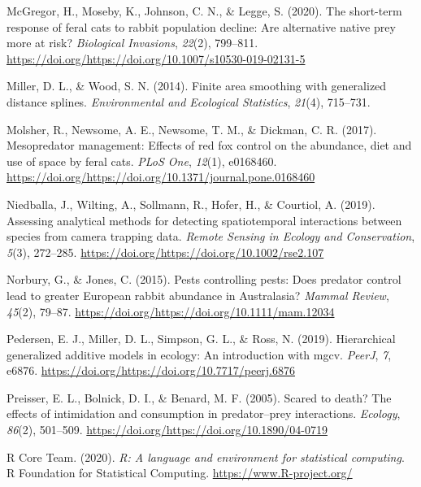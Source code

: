 \documentclass[]{elsarticle} %
\begin{document}
\leavevmode\hypertarget{ref-mcgregor2020short}{}%
McGregor, H., Moseby, K., Johnson, C. N., \& Legge, S. (2020). The short-term response of feral cats to rabbit population decline: Are alternative native prey more at risk? \emph{Biological Invasions}, \emph{22}(2), 799--811. \url{https://doi.org/https://doi.org/10.1007/s10530-019-02131-5}

\leavevmode\hypertarget{ref-miller2014finite}{}%
Miller, D. L., \& Wood, S. N. (2014). Finite area smoothing with generalized distance splines. \emph{Environmental and Ecological Statistics}, \emph{21}(4), 715--731.

\leavevmode\hypertarget{ref-molsher2017mesopredator}{}%
Molsher, R., Newsome, A. E., Newsome, T. M., \& Dickman, C. R. (2017). Mesopredator management: Effects of red fox control on the abundance, diet and use of space by feral cats. \emph{PLoS One}, \emph{12}(1), e0168460. \url{https://doi.org/https://doi.org/10.1371/journal.pone.0168460}

\leavevmode\hypertarget{ref-niedballa2019assessing}{}%
Niedballa, J., Wilting, A., Sollmann, R., Hofer, H., \& Courtiol, A. (2019). Assessing analytical methods for detecting spatiotemporal interactions between species from camera trapping data. \emph{Remote Sensing in Ecology and Conservation}, \emph{5}(3), 272--285. \url{https://doi.org/https://doi.org/10.1002/rse2.107}

\leavevmode\hypertarget{ref-norbury2015pests}{}%
Norbury, G., \& Jones, C. (2015). Pests controlling pests: Does predator control lead to greater European rabbit abundance in Australasia? \emph{Mammal Review}, \emph{45}(2), 79--87. \url{https://doi.org/https://doi.org/10.1111/mam.12034}

\leavevmode\hypertarget{ref-pedersen2019hierarchical}{}%
Pedersen, E. J., Miller, D. L., Simpson, G. L., \& Ross, N. (2019). Hierarchical generalized additive models in ecology: An introduction with mgcv. \emph{PeerJ}, \emph{7}, e6876. \url{https://doi.org/https://doi.org/10.7717/peerj.6876}

\leavevmode\hypertarget{ref-preisser2005scared}{}%
Preisser, E. L., Bolnick, D. I., \& Benard, M. F. (2005). Scared to death? The effects of intimidation and consumption in predator--prey interactions. \emph{Ecology}, \emph{86}(2), 501--509. \url{https://doi.org/https://doi.org/10.1890/04-0719}

\leavevmode\hypertarget{ref-R}{}%
R Core Team. (2020). \emph{R: A language and environment for statistical computing}. R Foundation for Statistical Computing. \url{https://www.R-project.org/}
\end{document}
